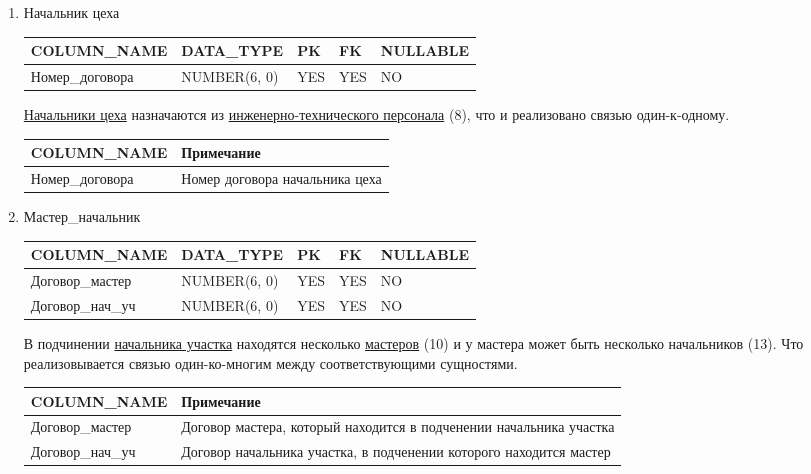 \begin{enumerate}
    \item{Начальник цеха}

    \begin{tabular}{|p{4cm}|p{3cm}|p{1cm}|p{1cm}|p{2cm}|} \hline

        {\bf COLUMN\_NAME} & {\bf DATA\_TYPE} & {\bf PK} & {\bf FK} & {\bf NULLABLE} \\ \hline
        Номер\_договора & NUMBER(6, 0) & YES & YES & NO \\ \hline

    \end{tabular}

    \underline{Начальники цеха} назначаются из \underline{инженерно-технического персонала} (8), что и реализовано связью один-к-одному.

    \begin{tabular}{|p{4cm}|p{5cm}|} \hline

        {\bf COLUMN\_NAME} & {\bf Примечание} \\ \hline
        Номер\_договора & Номер договора начальника цеха \\ \hline

    \end{tabular}

    \item Мастер\_начальник

    \begin{tabular}{|p{4cm}|p{3cm}|p{1cm}|p{1cm}|p{2cm}|} \hline

        {\bf COLUMN\_NAME} & {\bf DATA\_TYPE} & {\bf PK} & {\bf FK} & {\bf NULLABLE} \\ \hline
        Договор\_мастер & NUMBER(6, 0) & YES & YES & NO \\ \hline
        Договор\_нач\_уч & NUMBER(6, 0) & YES & YES & NO \\ \hline

    \end{tabular}

    В подчинении \underline{начальника участка} находятся несколько \underline{мастеров} (10) и у мастера может быть несколько начальников (13).
    Что реализовывается связью один-ко-многим между соответствующими сущностями.

    \begin{tabular}{|p{4cm}|p{5cm}|} \hline

        {\bf COLUMN\_NAME} & {\bf Примечание} \\ \hline
        Договор\_мастер & Договор мастера, который находится в подченении начальника участка \\ \hline
        Договор\_нач\_уч & Договор начальника участка, в подченении которого находится мастер \\ \hline


\end{tabular}
\end{enumerate}
